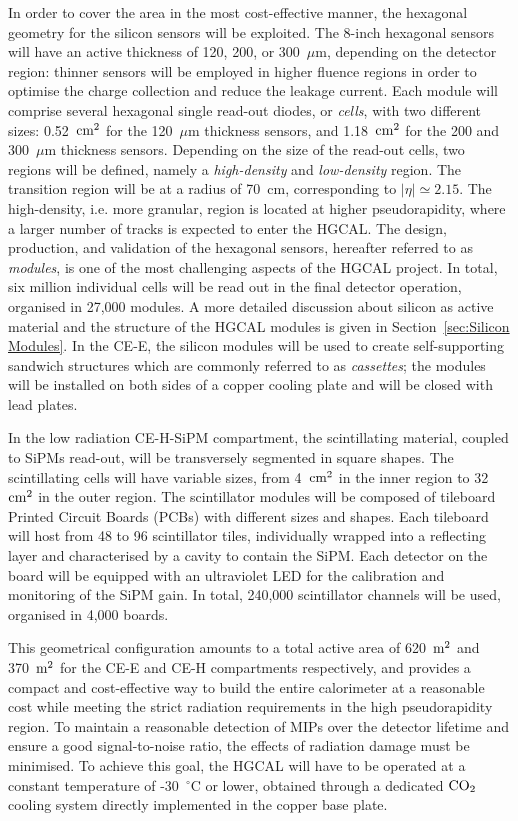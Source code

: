In order to cover the area in the most cost-effective manner, the hexagonal geometry for the silicon sensors will be exploited. 
The 8-inch hexagonal sensors will have an active thickness of 120, 200, or 300~$\mu$m, depending on the detector region: thinner sensors will be employed in higher fluence regions in order to optimise the charge collection and reduce the leakage current.
Each module will comprise several hexagonal single read-out diodes, or \textit{cells}, with two different sizes: 0.52~$\textnormal{cm}^2$ for the 120~$\mu$m thickness sensors, and 1.18~$\textnormal{cm}^2$ for the 200 and 300~$\mu$m thickness sensors.
Depending on the size of the read-out cells, two regions will be defined, namely a \textit{high-density} and \textit{low-density} region.
The transition region will be at a radius of 70~cm, corresponding to $|\eta| \simeq 2.15$. The high-density, i.e. more granular, region is located at higher pseudorapidity, where a larger number of tracks is expected to enter the HGCAL.
The design, production, and validation of the hexagonal sensors, hereafter referred to as \textit{modules}, is one of the most challenging aspects of the HGCAL project. In total, six million individual cells will be read out in the final detector operation, organised in 27,000 modules.
A more detailed discussion about silicon as active material and the structure of the HGCAL modules is given in Section~\ref{sec:Silicon Modules}. 
In the CE-E, the silicon modules will be used to create self-supporting sandwich structures which are commonly referred to as \textit{cassettes}; the modules will be installed on both sides of a copper cooling plate and will be closed with lead plates.

In the low radiation CE-H-SiPM compartment, the scintillating material, coupled to SiPMs read-out, will be transversely segmented in square shapes. The scintillating cells will have variable sizes, from 4~$\textnormal{cm}^2$ in the inner region to 32~$\textnormal{cm}^2$ in the outer region. 
The scintillator modules will be composed of tileboard Printed Circuit Boards (PCBs) with different sizes and shapes. Each tileboard will host from 48 to 96 scintillator tiles, individually wrapped into a reflecting layer and characterised by a cavity to contain the SiPM. Each detector on the board will be equipped with an ultraviolet LED for the calibration and monitoring of the SiPM gain. 
In total, 240,000 scintillator channels will be used, organised in 4,000 boards.

This geometrical configuration amounts to a total active area of 620~$\textnormal{m}^2$ and 370~$\textnormal{m}^2$ for the CE-E and CE-H compartments respectively, and provides a compact and cost-effective way to build the entire calorimeter at a reasonable cost while meeting the strict radiation requirements in the high pseudorapidity region.
To maintain a reasonable detection of MIPs over the detector lifetime and ensure a good signal-to-noise ratio, the effects of radiation damage must be minimised. To achieve this goal, the HGCAL will have to be operated at a constant temperature of -30~$^{\circ}$C or lower, obtained through a dedicated $\textnormal{CO}_2$ cooling system directly implemented in the copper base plate. 


